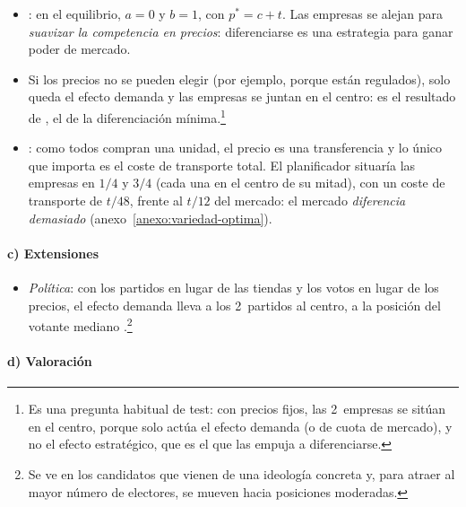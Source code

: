 \documentclass[11pt]{article}
\begin{document}
\begin{itemize}
\item {}: en el equilibrio, $a=0$ y $b=1$, con $p^*=c+t$. Las empresas se alejan para \emph{suavizar la competencia en precios}: diferenciarse es una estrategia para ganar poder de mercado.
\item Si los precios no se pueden elegir (por ejemplo, porque están regulados), solo queda el efecto demanda y las empresas se juntan en el centro: es el resultado de , el de la diferenciación mínima.\footnote{Es una pregunta habitual de test: con precios fijos, las 2~empresas se sitúan en el centro, porque solo actúa el efecto demanda (o de cuota de mercado), y no el efecto estratégico, que es el que las empuja a diferenciarse.}
\item {}: como todos compran una unidad, el precio es una transferencia y lo único que importa es el coste de transporte total. El planificador situaría las empresas en $1/4$ y $3/4$ (cada una en el centro de su mitad), con un coste de transporte de $t/48$, frente al $t/12$ del mercado: el mercado \emph{diferencia demasiado} (anexo~\ref{anexo:variedad-optima}).
\end{itemize}

\paragraph{c) Extensiones}

\begin{itemize}
\item \emph{Política}: con los partidos en lugar de las tiendas y los votos en lugar de los precios, el efecto demanda lleva a los 2~partidos al centro, a la posición del votante mediano .\footnote{Se ve en los candidatos que vienen de una ideología concreta y, para atraer al mayor número de electores, se mueven hacia posiciones moderadas.}
\end{itemize}

\paragraph{d) Valoración}
\end{document}
